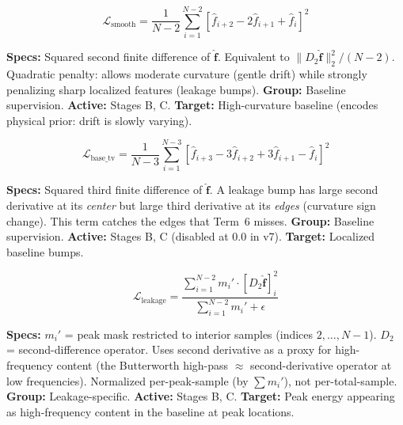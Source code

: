 \documentclass[11pt, letterpaper]{article}
\begin{document}
\begin{questionbox}
\normalfont
$$
\mathcal{L}_{\text{smooth}} = \frac{1}{N-2} \sum_{i=1}^{N-2} \left[\hat{f}_{i+2} - 2\hat{f}_{i+1} + \hat{f}_i\right]^2
$$
\end{questionbox}
\begin{answerbox}
\textbf{Specs:} Squared second finite difference of $\hat{\mathbf{f}}$.
Equivalent to $\|D_2 \hat{\mathbf{f}}\|_2^2 / (N-2)$.  Quadratic penalty: allows moderate curvature
(gentle drift) while strongly penalizing sharp localized features (leakage bumps).
\textbf{Group:} Baseline supervision.  \textbf{Active:} Stages B, C.
\textbf{Target:} High-curvature baseline (encodes physical prior: drift is slowly varying).
\end{answerbox}

\vspace{0.3em}

\begin{questionbox}
\normalfont
$$
\mathcal{L}_{\text{base\_tv}} = \frac{1}{N-3} \sum_{i=1}^{N-3} \left[\hat{f}_{i+3} - 3\hat{f}_{i+2} + 3\hat{f}_{i+1} - \hat{f}_i\right]^2
$$
\end{questionbox}
\begin{answerbox}
\textbf{Specs:} Squared third finite difference of $\hat{\mathbf{f}}$.
A leakage bump has large second derivative at its \emph{center} but large third derivative at its
\emph{edges} (curvature sign change).  This term catches the edges that Term~6 misses.
\textbf{Group:} Baseline supervision.  \textbf{Active:} Stages B, C (disabled at 0.0 in v7).
\textbf{Target:} Localized baseline bumps.
\end{answerbox}

\vspace{0.3em}

\begin{questionbox}
\normalfont
$$
\mathcal{L}_{\text{leakage}} = \frac{\sum_{i=1}^{N-2} m_i' \cdot [D_2\hat{\mathbf{f}}]_i^2}{\sum_{i=1}^{N-2} m_i' + \epsilon}
$$
\end{questionbox}
\begin{answerbox}
\textbf{Specs:} $m_i'$ = peak mask restricted to interior samples (indices $2,\ldots,N\!-\!1$).
$D_2$ = second-difference operator.  Uses second derivative as a proxy for high-frequency content (the
Butterworth high-pass $\approx$ second-derivative operator at low frequencies).
Normalized per-peak-sample (by $\sum m_i'$), not per-total-sample.
\textbf{Group:} Leakage-specific.  \textbf{Active:} Stages B, C.
\textbf{Target:} Peak energy appearing as high-frequency content in the baseline at peak locations.
\end{answerbox}
\end{document}
